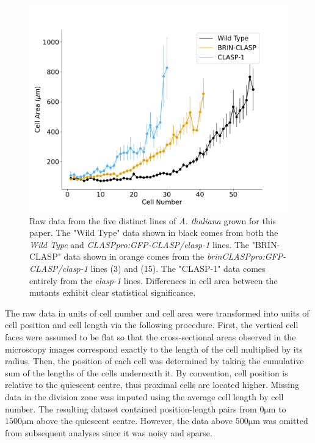 \documentclass[referee,pdflatex,sn-mathphys-num]{sn-jnl}
\newcommand{\um}{\unit{\micro\metre}}
\begin{document}
\begin{appendices}
\begin{figure}
  \centering
  \includegraphics[width=\textwidth]{data-unprocessed.pdf}
  \caption{Raw data from the five distinct lines of \emph{A. thaliana} grown for this paper.
  The "Wild Type" data shown in black comes from both the \emph{Wild Type} and \emph{CLASPpro:GFP-CLASP/clasp-1} lines.
The "BRIN-CLASP" data shown in orange comes from the \emph{brinCLASPpro:GFP-CLASP/clasp-1} lines (3) and (15).
The "CLASP-1" data comes entirely from the \emph{clasp-1} lines.
Differences in cell area between the mutants exhibit clear statistical significance. }
  \label{data-unprocesed}
\end{figure}

The raw data in units of cell number and cell area were transformed into units of cell position and cell length via the following procedure.
First, the vertical cell faces were assumed to be flat so that the cross-sectional areas observed in the microscopy images correspond exactly to the length of the cell multiplied by its radius.
Then, the position of each cell was determined by taking the cumulative sum of the lengths of the cells underneath it.
By convention, cell position is relative to the quiescent centre, thus proximal cells are located higher.
Missing data in the division zone was imputed using the average cell length by cell number.
The resulting dataset contained position-length pairs from $0\um$ to $1500\um$ above the quiescent centre.
However, the data above $500\um$ was omitted from subsequent analyses since it was noisy and sparse. 


\end{appendices}
\end{document}
